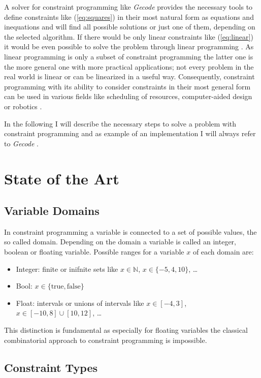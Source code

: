 \documentclass[10pt,
               a4paper,
               journal,
               ]{IEEEtran}
\newcommand{\refeq}[1]{{(\ref{#1})}}
\begin{document}
	A solver for constraint programming like \emph{Gecode} provides the necessary tools to define constraints like \refeq{eq:squares} in their most natural form as equations and inequations and will find all possible solutions or just one of them, depending on the selected algorithm. If there would be only linear constraints like \refeq{eq:linear} it would be even possible to solve the problem through linear programming \cite[1]{linearProgramming}. As linear programming is only a subset of constraint programming the latter one is the more general one with more practical applications; not every problem in the real world is linear or can be linearized in a useful way. Consequently, constraint programming with its ability to consider constraints in their most general form can be used in various fields like scheduling of resources, computer-aided design or robotics \cite[p.~221]{trendsInCP}.
	
	In the following I will describe the necessary steps to solve a problem with constraint programming and as example of an implementation I will always refer to \emph{Gecode} \cite{gecode}.
	
	\section{State of the Art}
	\subsection{Variable Domains}
	In constraint programming a variable is connected to a set of possible values, the so called domain. Depending on the domain a variable is called an integer, boolean or floating variable. Possible ranges for a variable $x$ of each domain are:
	\begin{itemize}
		\item Integer: finite or inifnite sets like $x \in \mathbb{N}$, $x \in \{-5, 4, 10\}$, \dots
		\item Bool: $x \in \{\text{true}, \text{false}\}$
		\item Float: intervals or unions of intervals like $x \in [-4, 3]$, $x \in [-10, 8] \cup [10, 12]$, \dots
	\end{itemize}
	This distinction is fundamental as especially for floating variables the classical combinatorial approach to constraint programming is impossible.
	
	\subsection{Constraint Types}
	
\end{document}
